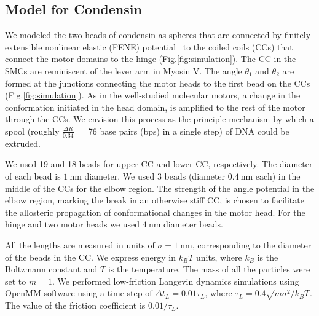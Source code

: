 \documentclass[aps,preprint]{revtex4-1}
\newcommand{\nm}{\ \mathrm{nm}}
\begin{document}
\subsection{Model for Condensin \label{sec:model}}
We modeled the two heads of condensin as spheres that are connected by finitely-extensible nonlinear elastic (FENE) potential~\cite{kremer1991erratum} to the coiled coils (CCs) that connect the motor domains to the hinge (Fig.\ref{fig:simulation}). The CC in the SMCs are reminiscent of the lever arm in Myosin V. The angle $\theta_1$ and $\theta_2$ are formed at the junctions connecting the motor heads to the first bead on the CCs (Fig.\ref{fig:simulation}).  As in the well-studied molecular motors, a  change in the conformation  initiated in the head domain, is  amplified to the rest of the motor through the CCs.  We envision this process as the principle mechanism by which a spool (roughly $\frac{\Delta R}{0.34}=$ 76 base pairs (bps)  in a single step) of DNA could be extruded. 

We used 19 and 18 beads for upper CC and lower CC, respectively. The diameter of each bead is $1 \nm$ diameter. We used 3 beads (diameter $0.4\nm$ each) in the middle of the CCs for the elbow region. The strength of the angle potential in the elbow region, marking the break in an otherwise stiff CC, is chosen to facilitate the allosteric propagation of conformational changes in the motor head. For the hinge and two motor heads we used $4\nm$ diameter beads. 

All the lengths are measured in units of $\sigma=1\nm$, corresponding to the diameter of the beads in the CC. We express energy in  $k_BT$ units, where $k_B$ is the Boltzmann constant and $T$ is the temperature. The mass of all the particles were set to $m=1$. We performed low-friction Langevin dynamics simulations using OpenMM \cite{eastman2017openmm} software using a  time-step of $\Delta t_L=0.01\tau_L$, where $\tau_L=0.4\sqrt{m\sigma^2/k_BT}$. The value of the friction coefficient is $0.01/\tau_L$. %
\end{document}
